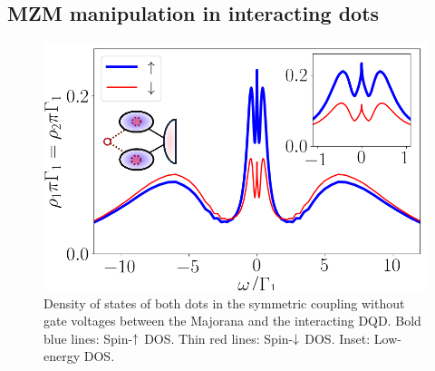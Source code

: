 \documentclass[showpacs,aps,prb,reprint,superscriptaddress]{revtex4-1}
\begin{document}

    \subsection{MZM manipulation in interacting dots \label{subsec:Interacting}}

		\begin{figure}[bt]
		\begin{center}
		\includegraphics[scale=0.4]{Graficos/NRG-t1=t2.png}
		\caption{  \label{fig:NRG_Majorana} Density of states of both dots in the symmetric coupling without gate voltages between the Majorana and the interacting DQD. Bold blue lines: Spin-$\uparrow$ DOS. Thin red lines: Spin-$\downarrow$ DOS. Inset: Low-energy DOS.
		}
		\end{center}
		\end{figure}
\end{document}
